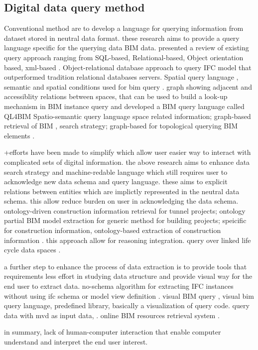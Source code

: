 \documentclass[Journal, InsideFigs, DoubleSpace]{ascelike} %
\begin{document}
\subsection{Digital data query method}
Conventional method are to develop a language for querying information from dataset stored in neutral data format. these research aims to provide a query language specific for the querying data BIM data. \cite{borrmann09} presented a review of existing query approach ranging from SQL-based, Relational-based, Object orientation based, xml-based . Object-relational database approach to query IFC model \cite{lee14} that outperformed tradition relational databases servers. Spatial query language , semantic and spatial conditions used for bim query \cite{borrmann09}.  graph showing adjacent and accessiblity relations between spaces, that can be used to build a look-up mechanism in BIM instance query and developed a BIM query language called QL4BIM Spatio-semantic query language \cite{daum14} space related information; graph-based retrieval of BIM \cite{langenhan13}, search strategy; graph-based for topological querying BIM elements \cite{khalili13}.
\par 
+efforts have been made to simplify which allow user easier way to interact with complicated sets of digital information. the above research aims to enhance data search strategy and machine-redable language which still requires user to acknowledge new data schema and query language. these aims to explicit relations between entities which are implictly represented in the neutral data schema. this allow reduce burden on user in acknowledging the data schema. ontology-driven construction information retrieval \cite{min14} for tunnel projects; ontology partial BIM model extraction \cite{zhang12} for generic method for building projects; speicific for construction information, ontology-based extraction of construction information \cite{nepal12}. this approach allow for reasoning integration. query over linked life cycle data spaces \cite{le16}.
\par
a further step to enhance the process of data extraction is to provide tools that requirements less effort in studying data structure and provide visual  way for the end user to extract data. no-schema algorithm for extracting IFC instances without using ifc schema or model view definition \cite{won13}. visual  BIM query \cite{wulfing14}, visual bim query language, predefined library, basically a visualization of query code. query data with mvd as input data, \cite{jiang15}. online BIM resources retrieval system \cite{gao15}. 
\par
in summary, lack of human-computer interaction that enable computer understand and interpret the end user interest. 
\end{document}
